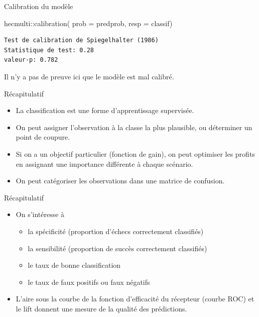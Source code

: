 \documentclass[
  ignorenonframetext,
]{beamer}
\newenvironment{Shaded}{\begin{snugshade}}{\end{snugshade}}
\newcommand{\AttributeTok}[1]{\textcolor[rgb]{0.40,0.45,0.13}{#1}}
\newcommand{\FunctionTok}[1]{\textcolor[rgb]{0.28,0.35,0.67}{#1}}
\newcommand{\NormalTok}[1]{\textcolor[rgb]{0.00,0.23,0.31}{#1}}
\newcommand{\SpecialCharTok}[1]{\textcolor[rgb]{0.37,0.37,0.37}{#1}}
\providecommand{\tightlist}{%
  \setlength{\itemsep}{0pt}\setlength{\parskip}{0pt}}\usepackage{longtable,booktabs,array}
\begin{document}
\begin{frame}[fragile]{Calibration du modèle}
\protect\hypertarget{calibration-du-moduxe8le-1}{}
\begin{Shaded}
\begin{Highlighting}[numbers=left,,]
\NormalTok{hecmulti}\SpecialCharTok{::}\FunctionTok{calibration}\NormalTok{(}
   \AttributeTok{prob =}\NormalTok{ predprob, }
   \AttributeTok{resp =}\NormalTok{ classif)}
\end{Highlighting}
\end{Shaded}

\begin{verbatim}
Test de calibration de Spiegelhalter (1986)
Statistique de test: 0.28 
valeur-p: 0.782
\end{verbatim}

Il n'y a pas de preuve ici que le modèle est mal calibré.
\end{frame}

\begin{frame}{Récapitulatif}
\protect\hypertarget{ruxe9capitulatif}{}
\begin{itemize}
\tightlist
\item
  La classification est une forme d'apprentissage supervisée.
\item
  On peut assigner l'observation à la classe la plus plausible, ou
  déterminer un point de coupure.
\item
  Si on a un objectif particulier (fonction de gain), on peut optimiser
  les profits en assignant une importance différente à chaque scénario.
\item
  On peut catégoriser les observations dans une matrice de confusion.
\end{itemize}
\end{frame}

\begin{frame}{Récapitulatif}
\protect\hypertarget{ruxe9capitulatif-1}{}
\begin{itemize}
\tightlist
\item
  On s'intéresse à

  \begin{itemize}
  \tightlist
  \item
    la spécificité (proportion d'échecs correctement classifiés)
  \item
    la sensibilité (proportion de succès correctement classifiés)
  \item
    le taux de bonne classification
  \item
    le taux de faux positifs ou faux négatifs
  \end{itemize}
\item
  L'aire sous la courbe de la fonction d'efficacité du récepteur (courbe
  ROC) et le lift donnent une mesure de la qualité des prédictions.
\end{itemize}
\end{frame}
\end{document}
